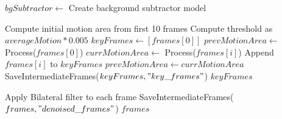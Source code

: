 \documentclass[11pt]{report}
\begin{document}
\begin{algorithm}[H]
\caption{Extract Key Frames Using Background Subtraction}


\begin{algorithmic}[1]
    \State $bgSubtractor \gets$ Create background subtractor model


    \State Compute initial motion area from first 10 frames
    \State Compute threshold as $averageMotion * 0.005$
    \State $keyFrames \gets [frames[0]]$
    \State $prevMotionArea \gets$ Process($frames[0]$)
        \State $currMotionArea \gets$ Process($frames[i]$)
            \State Append $frames[i]$ to $keyFrames$
        \EndIf
        \State $prevMotionArea \gets currMotionArea$
    \EndFor
    \State SaveIntermediateFrames($keyFrames, "key\_frames"$)
    \State \Return $keyFrames$
\EndFunction
\end{algorithmic}
\end{algorithm}

\begin{algorithm}[H]
\caption{Reduce Noise in Frames}
\begin{algorithmic}[1]
    \State Apply Bilateral filter to each frame
    \State SaveIntermediateFrames($frames, "denoised\_frames"$)
    \State \Return $frames$
\EndFunction
\end{algorithmic}
\end{algorithm}
\end{document}
